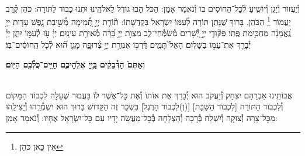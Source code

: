 \documentclass[twoside, openany, parskip=half, 11pt]{book}
\begin{document}
\avharachamim

\\
וְ֯יַעֲזוֹר וְ֯יָגֵן וְ֯יוֹשִֽׁיעַ לְ֯כׇל־הַחוֹסִים בּוֹ וְ֯נֹאמַר אָמֵן:
הַכֹּל הָבוּ גוֹדֶל לֵאלֹהֵֽינוּ וּתְנוּ כָבוֹד לַתּוֹרָה: כֹּהֵן קְ֯רָב יַעֲמוֹד
\footnote{ אֵין כַּאן כֹּהֵן}
הַכֹּהֵן. בָּרוּךְ שֶׁנָּתַן תּוֹרָה לְ֯עַמּוֹ יִשְׂרָאֵל בִּקְדֻשָּׁתוֹ:
תּ֘וֹרַ֤ת יְיָ֣ תְּ֭֯מִימָה מְ֯שִׁ֣יבַת נָ֑פֶשׁ עֵד֖וּת יְיָ֥ נֶֽ֝אֱמָנָ֗ה מַחְכִּ֥ימַת פֶּֽתִי׃ פִּקּ֘וּדֵ֤י יְיָ֣ יְ֭֯שָׁרִים מְ֯שַׂמְּ֯חֵי־לֵ֑ב מִצְוַ֖ת יְיָ֥ בָּ֝רָ֗ה מְ֯אִירַ֥ת עֵינָֽיִם׃
יְיָ֗ עֹ֖ז לְ֯עַמּ֣וֹ יִתֵּ֑ן יְיָ֓ יְ֯בָרֵ֖ךְ אֶת־עַמּ֣וֹ בַשָּׁלֽוֹם׃
הָאֵל֮ תָּמִ֢ים דַּ֫רְכּ֥וֹ אִמְרַ֣ת יְיָ֣ צְ֯רוּפָ֑ה מָגֵ֥ן ה֝֗וּא לְ֯כֹ֤ל הַֽחוֹסִ֬ים־בּֽוֹ׃


\textbf{וְאַתֶּם֙ הַדְּ֯בֵקִ֔ים בַּֽיְ֖יָ אֱלֹֽהֵיכֶ֑ם חַיִּ֥ים־כֻּלְּ֯כֶ֖ם הַיּֽוֹם׃} 

\nextpage

\torahbarachu

\hagomel

\\
אֲבוֹתֵֽינוּ אַבְרָהָם יִצְחָק וְ֯יַעֲקֹב הוּא יְ֯בָרֵךְ אֶת
אוֹתוֹ וְ֯אֶת כׇּל־אֲשֶׁר לוֹ
בַּעֲבוּר שֶׁעָלָה לִכְבוֹד הַמָּקוֹם וְ֯לִכְבוֹד הַתּוֹרָה
[לִכְבוֹד הַשַּׁבָּת]
[(וְ)לִכְבוֹד הָרֶגֶל]
בִּשְׂכַר זֶה הַקָּדוֹשׁ בָּרוּךְ הוּא יִשְׁמְ֯רֵֽהוּ וְ֯יַצִּילֵֽהוּ מִכׇּל־צָרָה וְ֯צוּקָה וְ֯יִשְׁלַח בְּ֯רָכָה וְ֯הַצְלָחָה בְּ֯כׇל־מַעֲשֵׂה יָדָיו עִם כׇּל־יִשְׂרָאֵל אֶחָיו: וְ֯נֹאמַר אָמֵן:
\end{document}
